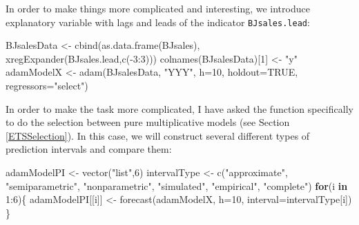 \documentclass[
]{book}
\newenvironment{Shaded}{\begin{snugshade}}{\end{snugshade}}
\newcommand{\AttributeTok}[1]{\textcolor[rgb]{0.77,0.63,0.00}{#1}}
\newcommand{\ConstantTok}[1]{\textcolor[rgb]{0.00,0.00,0.00}{#1}}
\newcommand{\ControlFlowTok}[1]{\textcolor[rgb]{0.13,0.29,0.53}{\textbf{#1}}}
\newcommand{\DecValTok}[1]{\textcolor[rgb]{0.00,0.00,0.81}{#1}}
\newcommand{\FunctionTok}[1]{\textcolor[rgb]{0.00,0.00,0.00}{#1}}
\newcommand{\NormalTok}[1]{#1}
\newcommand{\OtherTok}[1]{\textcolor[rgb]{0.56,0.35,0.01}{#1}}
\newcommand{\SpecialCharTok}[1]{\textcolor[rgb]{0.00,0.00,0.00}{#1}}
\newcommand{\StringTok}[1]{\textcolor[rgb]{0.31,0.60,0.02}{#1}}
\theoremstyle{definition}
\theoremstyle{definition}
\theoremstyle{definition}
\theoremstyle{definition}
\theoremstyle{remark}
\begin{document}
In order to make things more complicated and interesting, we introduce explanatory variable with lags and leads of the indicator \texttt{BJsales.lead}:

\begin{Shaded}
\begin{Highlighting}[]
\NormalTok{BJsalesData }\OtherTok{\textless{}{-}} \FunctionTok{cbind}\NormalTok{(}\FunctionTok{as.data.frame}\NormalTok{(BJsales),}
                     \FunctionTok{xregExpander}\NormalTok{(BJsales.lead,}\FunctionTok{c}\NormalTok{(}\SpecialCharTok{{-}}\DecValTok{3}\SpecialCharTok{:}\DecValTok{3}\NormalTok{)))}
\FunctionTok{colnames}\NormalTok{(BJsalesData)[}\DecValTok{1}\NormalTok{] }\OtherTok{\textless{}{-}} \StringTok{"y"}
\NormalTok{adamModelX }\OtherTok{\textless{}{-}} \FunctionTok{adam}\NormalTok{(BJsalesData, }\StringTok{"YYY"}\NormalTok{,}
                   \AttributeTok{h=}\DecValTok{10}\NormalTok{, }\AttributeTok{holdout=}\ConstantTok{TRUE}\NormalTok{,}
                   \AttributeTok{regressors=}\StringTok{"select"}\NormalTok{)}
\end{Highlighting}
\end{Shaded}

In order to make the task more complicated, I have asked the function specifically to do the selection between pure multiplicative models (see Section \ref{ETSSelection}). In this case, we will construct several different types of prediction intervals and compare them:

\begin{Shaded}
\begin{Highlighting}[]
\NormalTok{adamModelPI }\OtherTok{\textless{}{-}} \FunctionTok{vector}\NormalTok{(}\StringTok{"list"}\NormalTok{,}\DecValTok{6}\NormalTok{)}
\NormalTok{intervalType }\OtherTok{\textless{}{-}} \FunctionTok{c}\NormalTok{(}\StringTok{"approximate"}\NormalTok{, }\StringTok{"semiparametric"}\NormalTok{,}
                  \StringTok{"nonparametric"}\NormalTok{, }\StringTok{"simulated"}\NormalTok{,}
                  \StringTok{"empirical"}\NormalTok{, }\StringTok{"complete"}\NormalTok{)}
\ControlFlowTok{for}\NormalTok{(i }\ControlFlowTok{in} \DecValTok{1}\SpecialCharTok{:}\DecValTok{6}\NormalTok{)\{}
\NormalTok{  adamModelPI[[i]] }\OtherTok{\textless{}{-}} \FunctionTok{forecast}\NormalTok{(adamModelX, }\AttributeTok{h=}\DecValTok{10}\NormalTok{,}
                               \AttributeTok{interval=}\NormalTok{intervalType[i])}
\NormalTok{\}}
\end{Highlighting}
\end{Shaded}
\end{document}
